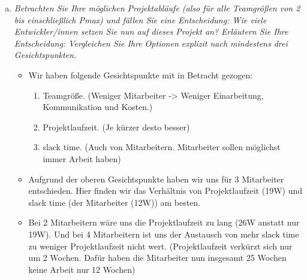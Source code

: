 \begin{enumerate}[(a)]
    
    \item {\itshape Betrachten Sie Ihre möglichen Projektabläufe (also für alle Teamgrößen von 2 bis einschließlich Pmax) und fällen Sie eine Entscheidung: Wie viele Entwickler/innen setzen Sie nun auf dieses Projekt an? Erläutern Sie Ihre Entscheidung: Vergleichen Sie Ihre Optionen explizit nach mindestens drei Gesichtspunkten.}
    \begin{itemize}
        \item Wir haben folgende Gesichtspunkte mit in Betracht gezogen:
        \begin{enumerate}[1.]
            \item Teamgröße. (Weniger Mitarbeiter -> Weniger Einarbeitung, Kommunikation und Kosten.)
            \item Projektlaufzeit. (Je kürzer desto besser)
            \item slack time. (Auch von Mitarbeitern. Mitarbeiter sollen möglichst immer Arbeit haben)
        \end{enumerate}
        \item Aufgrund der oberen Gesichtspunkte haben wir uns für 3 Mitarbeiter entschieden. Hier finden wir das Verhältnis von Projektlaufzeit (19W) und slack time (der Mitarbeiter (12W)) am besten.
        \item Bei 2 Mitarbeitern wäre uns die Projektlaufzeit zu lang (26W anstatt nur 19W). Und bei 4 Mitarbeitern ist uns der Austausch von mehr slack time zu weniger Projektlaufzeit nicht wert. (Projektlaufzeit verkürzt sich nur um 2 Wochen. Dafür haben die Mitarbeiter nun insgesamt 25 Wochen keine Arbeit nur 12 Wochen)
    \end{itemize}



\end{enumerate}

